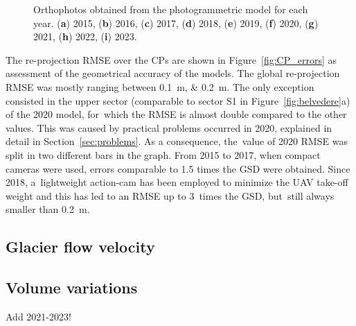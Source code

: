 \begin{figure}
{    }
    \caption{Orthophotos obtained from the photogrammetric model for each year.
        (\textbf{a}) 2015, (\textbf{b}) 2016, (\textbf{c}) 2017, (\textbf{d}) 2018,
        (\textbf{e})
        2019, (\textbf{f}) 2020, (\textbf{g}) 2021, (\textbf{h}) 2022, (\textbf{i})
        2023.}
    \label{fig:ortophoto}
\end{figure}

The re-projection RMSE over the CPs are shown in Figure~\ref{fig:CP_errors} as assessment
of the geometrical accuracy of the models.
The global re-projection RMSE was mostly ranging between \SIlist{0.1;0.2}{\meter}.
The only exception consisted in the upper sector (comparable to sector S1 in
Figure~\ref{fig:belvedere}a) of the 2020 model, for~which the RMSE is almost double
compared to the other values.
This was caused by practical problems occurred in 2020, explained in detail in
Section~\ref{sec:problems}.
As a consequence, the~value of 2020 RMSE was split in two different bars in the graph.
From 2015 to 2017, when compact cameras were used, errors comparable to 1.5 times the GSD
were obtained.
Since 2018, a~lightweight action-cam has been employed to minimize the UAV take-off
weight and this has led to an RMSE up to 3~times the GSD, but~still always smaller than
\SI{0.2}{\meter}.

\subsection{Glacier flow velocity}

\subsection{Volume variations}

{\color{red} Add 2021-2023!}

